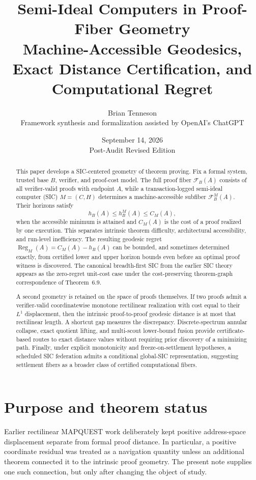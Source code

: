 \documentclass[11pt]{article}
\title{\textbf{Semi-Ideal Computers in Proof-Fiber Geometry}\\
\large Machine-Accessible Geodesics, Exact Distance Certification, and Computational Regret}
\author{Brian Tenneson\\Framework synthesis and formalization assisted by OpenAI's ChatGPT}
\date{September 14, 2026\\Post-Audit Revised Edition}
\theoremstyle{definition}
\newcommand{\Fib}{\mathcal F}
\newcommand{\Reg}{\operatorname{Reg}}
\begin{document}
\maketitle

\begin{abstract}
This paper develops a SIC-centered geometry of theorem proving.  Fix a formal system, trusted base $B$, verifier, and proof-cost model.  The full proof fiber $\Fib_B(A)$ consists of all verifier-valid proofs with endpoint $A$, while a transaction-logged semi-ideal computer (SIC) $M=(C,H)$ determines a machine-accessible subfiber $\Fib_B^M(A)$.  Their horizons satisfy
\[
h_B(A)\le h_B^M(A)\le C_M(A),
\]
when the accessible minimum is attained and $C_M(A)$ is the cost of a proof realized by one execution.  This separates intrinsic theorem difficulty, architectural accessibility, and run-level inefficiency.  The resulting geodesic regret $\Reg_M(A)=C_M(A)-h_B(A)$ can be bounded, and sometimes determined exactly, from certified lower and upper horizon bounds even before an optimal proof witness is discovered.  The canonical breadth-first SIC from the earlier SIC theory appears as the zero-regret unit-cost case under the cost-preserving theorem-graph correspondence of Theorem~6.9.

A second geometry is retained on the space of proofs themselves.  If two proofs admit a verifier-valid coordinatewise monotone rectilinear realization with cost equal to their $L^1$ displacement, then the intrinsic proof-to-proof geodesic distance is at most that rectilinear length.  A shortcut gap measures the discrepancy.  Discrete-spectrum annular collapse, exact quotient lifting, and multi-scout lower-bound fusion provide certificate-based routes to exact distance values without requiring prior discovery of a minimizing path.  Finally, under explicit monotonicity and freeze-on-settlement hypotheses, a scheduled SIC federation admits a conditional global-SIC representation, suggesting settlement fibers as a broader class of certified computational fibers.
\end{abstract}

\section{Purpose and theorem status}

Earlier rectilinear MAPQUEST work deliberately kept positive address-space displacement separate from formal proof distance.  In particular, a positive coordinate residual was treated as a navigation quantity unless an additional theorem connected it to the intrinsic proof geometry.  The present note supplies one such connection, but only after changing the object of study.
\end{document}
